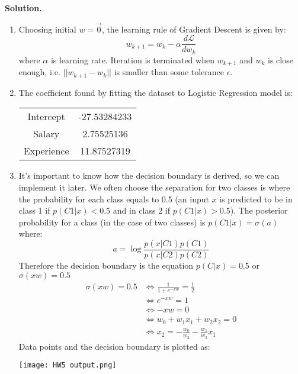 \documentclass[a4paper, 12pt]{article}  %
\begin{document}
\textbf{Solution.} 
\begin{enumerate}
    \item Choosing initial $w = \overrightarrow{0}$, the learning rule of Gradient Descent is given by:
    \[w_{k+1} = w_k - \alpha \frac{d \mathcal{L}}{d w_k}\]
    where $\alpha$ is learning rate. Iteration is terminated when $w_{k+1}$ and $w_k$ is close enough, i.e. $||w_{k+1} - w_k||$ is smaller than some tolerance $\epsilon$.
    
    \item The coefficient found by fitting the dataset to Logistic Regression model is:
    \begin{center}
    \begin{tabular}{ |c|c| } 
    \hline
    Intercept & -27.53284233 \\ 
    Salary & 2.75525136 \\ 
    Experience & 11.87527319 \\ 
    \hline
    \end{tabular}
    \end{center}
    \item It's important to know how the decision boundary is derived, so we can implement it later. We often choose the separation for two classes is where the probability for each class equals to 0.5 (an input $x$ is predicted to be in class 1 if $p(C1 | x) < 0.5$ and in class 2 if $p(C1 | x) > 0.5$). The posterior probability for a class (in the case of two classes) is $p(C1 | x) = \sigma(a)$ where: \[a = \log \frac{p(x | C1) p(C1)}{p(x |C2) p(C2)}\] 
    Therefore the decision boundary is the equation $p(C | x) = 0.5$ or $\sigma(x w) = 0.5$ \begin{align*}
        \sigma(x w) = 0.5 &\Leftrightarrow \frac{1}{1 + e^{-x w}} = \frac{1}{2}\\
        & \Leftrightarrow e^{-x w} = 1 \\
        &\Leftrightarrow -x w = 0 \\
        &\Leftrightarrow w_0 + w_1 x_1 + w_2 x_2 = 0 \\
        & \Leftrightarrow x_2 = -\frac{w_0}{w_2} - \frac{w_1}{w_2} x_1
    \end{align*} 
    Data points and the decision boundary is plotted as:
    
    \centering
    \texttt{[image: HW5 output.png]}
\end{enumerate}

\end{document}
